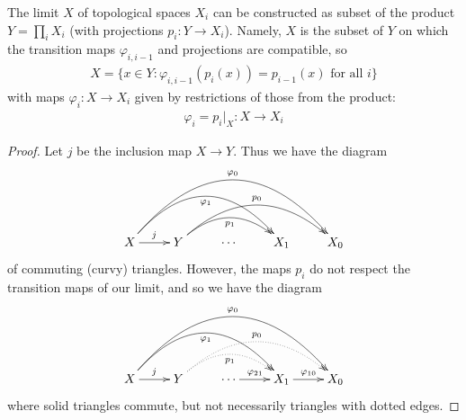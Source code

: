         \begin{claim}
          The limit $X$ of topological spaces $X_i$ can be constructed as subset of the product $Y=\prod_i X_i$ (with projections $p_i:Y\rightarrow X_i$).
          Namely, $X$ is the subset of $Y$ on which the transition maps $\varphi_{i,i-1}$ and projections are compatible, so
          \begin{align*}
            X = \{x\in Y: \varphi_{i,i-1}(p_i(x)) = p_{i-1}(x) \text{ for all } i\}
          \end{align*}
          with maps $\varphi_i:X\rightarrow X_i$ given by restrictions of those from the product:
          \begin{align*}
            \varphi_i = p_i|_X :X\rightarrow X_i
          \end{align*}
          \begin{proof}
            Let $j$ be the inclusion map $X\rightarrow Y$.
            Thus we have the diagram
            \begin{displaymath}
              \xymatrix{
                X \ar[r]^j \ar@/^37pt/[rrr]_{\varphi_1} \ar@/^50pt/[rrrr]^{\varphi_0}
                & Y \ar@/^20pt/[rr]_{p_1} \ar@/^30pt/[rrr]^{p_0}
                & \cdots
                & X_1
                & X_0
              }
            \end{displaymath}
            of commuting (curvy) triangles.
            However, the maps $p_i$ do not respect the transition maps of our limit, and so we have the diagram
            \begin{displaymath}
              \xymatrix{
                X \ar[r]^j \ar@/^37pt/[rrr]_{\varphi_1} \ar@/^50pt/[rrrr]^{\varphi_0}
                & Y \ar@/^20pt/@{..>}[rr]_{p_1} \ar@/^30pt/@{..>}[rrr]^{p_0}
                & \cdots \ar[r]^{\varphi_{21}}
                & X_1 \ar[r]^{\varphi_{10}}
                & X_0
              }
            \end{displaymath}
            where solid triangles commute, but not necessarily triangles with dotted edges.
            

\end{proof}
\end{claim}

